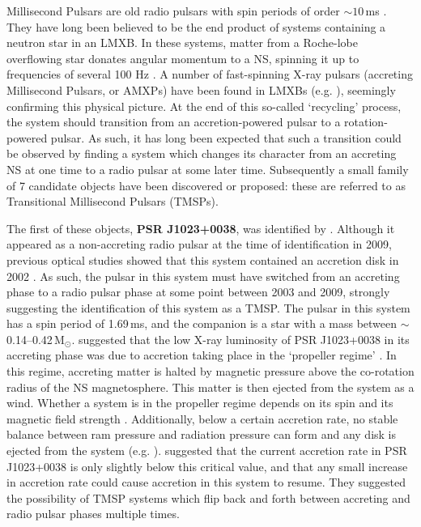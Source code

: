 \par Millisecond Pulsars are old radio pulsars with spin periods of order $\sim10$\,ms \citep{Backer_MSP}. They have long been believed to be the end product of systems containing a neutron star in an LMXB. In these systems, matter from a Roche-lobe overflowing star donates angular momentum to a NS, spinning it up to frequencies of several 100 Hz \citep{Alpar_MSP}. A number of fast-spinning X-ray pulsars (accreting Millisecond Pulsars, or AMXPs) have been found in LMXBs (e.g. \citealp{Wijnands_XRPulsar,Altamirano_Broken,Patruno_AllAMXPs,Sanna_AMXP}), seemingly confirming this physical picture. At the end of this so-called `recycling' process, the system should transition from an accretion-powered pulsar to a rotation-powered pulsar. As such, it has long been expected that such a transition could be observed by finding a system which changes its character from an accreting NS at one time to a radio pulsar at some later time. Subsequently a small family of 7 candidate objects have been discovered or proposed: these are referred to as Transitional Millisecond Pulsars (TMSPs).
\par The first of these objects, \textbf{PSR J1023+0038}, was identified by \citealp{Archibald_Link}. Although it appeared as a non-accreting radio pulsar at the time of identification in 2009, previous optical studies showed that this system contained an accretion disk in 2002 \citep{Szkody_1023Accretion}. As such, the pulsar in this system must have switched from an accreting phase to a radio pulsar phase at some point between 2003 and 2009, strongly suggesting the identification of this system as a TMSP. The pulsar in this system has a spin period of 1.69\,ms, and the companion is a star with a mass between $\sim$0.14--0.42\,M$_\odot$. \citealp{Archibald_Link} suggested that the low X-ray luminosity of PSR J1023+0038 in its accreting phase was due to accretion taking place in the `propeller regime' \citep{Illarionov_Propellor}. In this regime, accreting matter is halted by magnetic pressure above the co-rotation radius of the NS magnetosphere. This matter is then ejected from the system as a wind. Whether a system is in the propeller regime depends on its spin and its magnetic field strength \citep{Lewin_QPORev}. Additionally, below a certain accretion rate, no stable balance between ram pressure and radiation pressure can form and any disk is ejected from the system (e.g. \citealp{Campana_NoDisk}). \citealp{Archibald_Link} suggested that the current accretion rate in PSR J1023+0038 is only slightly below this critical value, and that any small increase in accretion rate could cause accretion in this system to resume. They suggested the possibility of TMSP systems which flip back and forth between accreting and radio pulsar phases multiple times.
